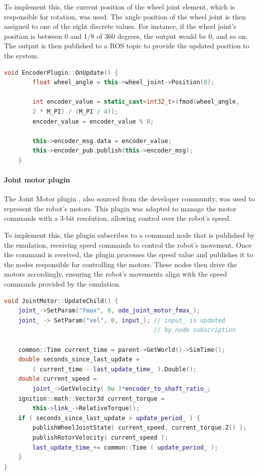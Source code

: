 \documentclass[../../monografia.tex]{subfiles}
\begin{document}
To implement this, the current position of the wheel joint element, which is responsible for rotation, was used. The angle position of the wheel joint is then assigned to one of the eight discrete values. For instance, if the wheel joint’s position is between 0 and 1/8 of 360 degrees, the output would be 0, and so on. The output is then published to a ROS topic to provide the updated position to the system.

\begin{lstlisting}[language=C++, caption={Encoder plugin position update function}]
void EncoderPlugin::OnUpdate() {
        float wheel_angle = this->wheel_joint->Position(0);

        int encoder_value = static_cast<int32_t>(fmod(wheel_angle,
        2 * M_PI) / (M_PI / 4));
        encoder_value = encoder_value % 8;

        this->encoder_msg.data = encoder_value;
        this->encoder_pub.publish(this->encoder_msg);
    }
\end{lstlisting}

\paragraph{Joint motor plugin}

The Joint Motor plugin \cite{Gazebo_ROS_Motors_23}, also sourced from the developer community, was used to represent the robot’s motors. This plugin was adapted to manage the motor commands with a 3-bit resolution, allowing control over the robot’s speed.

To implement this, the plugin subscribes to a command node that is published by the emulation, receiving speed commands to control the robot's movement. Once the command is received, the plugin processes the speed value and publishes it to the nodes responsible for controlling the motors. These nodes then drive the motors accordingly, ensuring the robot's movements align with the speed commands provided by the emulation.

\begin{lstlisting}[language=C++, caption={Joint motor update function}]
void JointMotor::UpdateChild() {
    joint_->SetParam("fmax", 0, ode_joint_motor_fmax_);
    joint_ -> SetParam("vel", 0, input_); // input_ is updated 
                                          // by node subscription

    common::Time current_time = parent->GetWorld()->SimTime();
    double seconds_since_last_update = 
        ( current_time - last_update_time_ ).Double();
    double current_speed = 
        joint_->GetVelocity( 0u )*encoder_to_shaft_ratio_;
    ignition::math::Vector3d current_torque = 
        this->link_->RelativeTorque();
    if ( seconds_since_last_update > update_period_ ) {
        publishWheelJointState( current_speed, current_torque.Z() );
        publishRotorVelocity( current_speed );
        last_update_time_+= common::Time ( update_period_ );
    }
}
\end{lstlisting}
\end{document}
